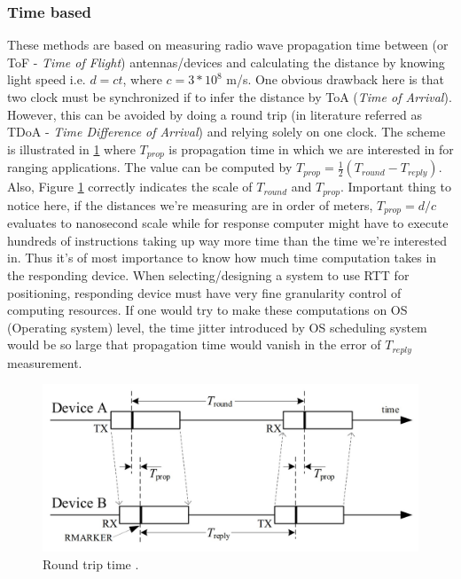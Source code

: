 \subsubsection{Time based}

These methods are based on measuring radio wave propagation time between (or ToF - \emph{Time of Flight}) antennas/devices and calculating the distance by knowing light speed i.e. $d=ct$, where $c=3 * 10^{8}$ m/s. One obvious drawback here is that two clock must be synchronized if to infer the distance by ToA (\emph{Time of Arrival}). However, this can be avoided by doing a round trip (in literature referred as TDoA - \emph{Time Difference of Arrival}) and relying solely on one clock. The scheme is illustrated in \ref{fig:RTT} where $T_{prop}$ is propagation time in which we are interested in for ranging applications. The value can be computed by $T_{prop} = \frac{1}{2}(T_{round} - T_{reply})$. Also, Figure \ref{fig:RTT} correctly indicates the scale of $T_{round}$ and $T_{prop}$. Important thing to notice here, if the distances we're measuring are in order of meters, $T_{prop} = d/c$ evaluates to nanosecond scale while for response computer might have to execute hundreds of instructions taking up way more time than the time we're interested in. Thus it's of most importance to know how much time computation takes in the responding device. When selecting/designing a system to use RTT for positioning, responding device must have very fine granularity control of computing resources. If one would try to make these computations on OS (Operating system) level, the time jitter introduced by OS scheduling system would be so large that propagation time would vanish in the error of $T_{reply}$ measurement.
\begin{figure}[H]
    \includegraphics[width=\linewidth]{figures/RTT.jpg}
    \caption{Round trip time \cite{9179124}.}
    \label{fig:RTT}
\end{figure}


